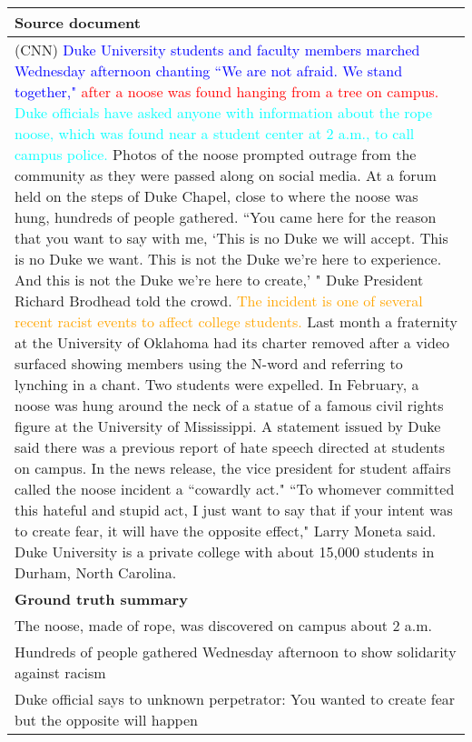 \documentclass[11pt,a4paper]{article}
\begin{document}
\clearpage
\appendix

\begin{table*}
\centering
\begin{adjustbox}{width=\textwidth}
\begin{tabular}{|p{15cm}|}
    \hline 
    \bf Source document \\
    \hline
(CNN) \textcolor{blue}{Duke University students and faculty members marched Wednesday afternoon chanting ``We are not afraid. We stand together,"} \textcolor{red}{after a noose was found hanging from a tree on campus.}
\textcolor{cyan}{Duke officials have asked anyone with information about the rope noose, which was found near a student center at 2 a.m., to call campus police.}
Photos of the noose prompted outrage from the community as they were passed along on social media.
At a forum held on the steps of Duke Chapel, close to where the noose was hung, hundreds of people gathered.
``You came here for the reason that you want to say with me, `This is no Duke we will accept. This is no Duke we want. This is not the Duke we're here to experience. And this is not the Duke we're here to create,' " Duke President Richard Brodhead told the crowd.
\textcolor{orange}{The incident is one of several recent racist events to affect college students.}
Last month a fraternity at the University of Oklahoma had its charter removed after a video surfaced showing members using the N-word and referring to lynching in a chant. Two students were expelled.
In February, a noose was hung around the neck of a statue of a famous civil rights figure at the University of Mississippi.
A statement issued by Duke said there was a previous report of hate speech directed at students on campus.
In the news release, the vice president for student affairs called the noose incident a ``cowardly act."
``To whomever committed this hateful and stupid act, I just want to say that if your intent was to create fear, it will have the opposite effect," Larry Moneta said.
Duke University is a private college with about 15,000 students in Durham, North Carolina. \\
   \hline
   \bf Ground truth summary \\
   \hline
   The noose, made of rope, was discovered on campus about 2 a.m.\\
   Hundreds of people gathered Wednesday afternoon to show solidarity against racism\\
   Duke official says to unknown perpetrator: You wanted to create fear but the opposite will happen\\

\end{tabular}
\end{adjustbox}
\end{table*}
\end{document}
